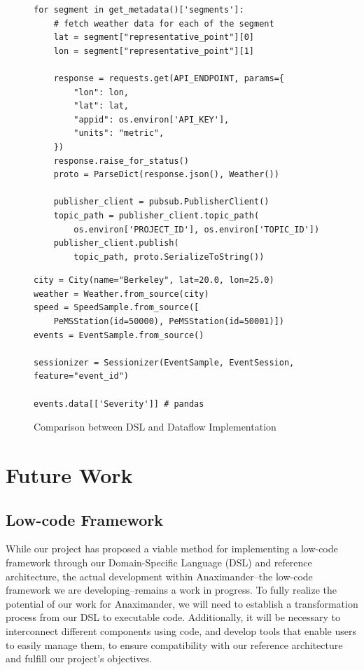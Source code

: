 \begin{landscape}
\begin{figure}
    \centering
  \begin{minipage}[t]{.45\linewidth}
\begin{verbatim}
for segment in get_metadata()['segments']:
    # fetch weather data for each of the segment
    lat = segment["representative_point"][0]
    lon = segment["representative_point"][1]

    response = requests.get(API_ENDPOINT, params={
        "lon": lon,
        "lat": lat,
        "appid": os.environ['API_KEY'],
        "units": "metric",
    })
    response.raise_for_status()
    proto = ParseDict(response.json(), Weather())

    publisher_client = pubsub.PublisherClient()
    topic_path = publisher_client.topic_path(
        os.environ['PROJECT_ID'], os.environ['TOPIC_ID'])
    publisher_client.publish(
        topic_path, proto.SerializeToString())
\end{verbatim}
\end{minipage}
\begin{minipage}[t]{.45\linewidth}
\begin{verbatim}
city = City(name="Berkeley", lat=20.0, lon=25.0)
weather = Weather.from_source(city)
speed = SpeedSample.from_source([
    PeMSStation(id=50000), PeMSStation(id=50001)])
events = EventSample.from_source()

sessionizer = Sessionizer(EventSample, EventSession, feature="event_id")

events.data[['Severity']] # pandas
\end{verbatim}
\end{minipage}  
    \caption{Comparison between DSL and Dataflow Implementation}
    \label{fig:comparison}
\end{figure}
\end{landscape}

\section{Future Work}
\subsection{Low-code Framework}

 While our project has proposed a viable method for implementing a low-code framework through our Domain-Specific Language (DSL) and reference architecture, the actual development within Anaximander--the low-code framework we are developing--remains a work in progress. To fully realize the potential of our work for Anaximander, we will need to establish a transformation process from our DSL to executable code. Additionally, it will be necessary to interconnect different components using code, and develop tools that enable users to easily manage them, to ensure compatibility with our reference architecture and fulfill our project's objectives.

